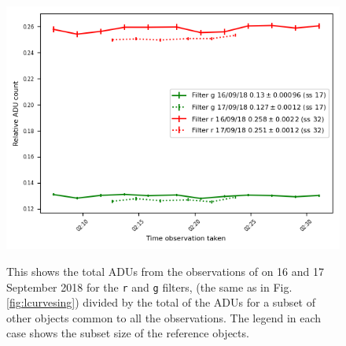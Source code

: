\begin{figure}[!htbp]
\begin{center}
\includegraphics[scale=1]{images/demo_lcurve_refs.png}
\end{center}
\caption{This shows the total ADUs from the observations of {\prox} on 16 and
17 September 2018 for the \texttt{r} and \texttt{g} filters, (the same as in
Fig. \ref{fig:lcurvesing}) divided by the total of the ADUs for a subset of
other objects common to all the observations. The legend in each case shows the
subset size of the reference objects. }
\protect\label{fig:lcurveref}
\end{figure}

\clearpage

% 
% 
% 
% 

